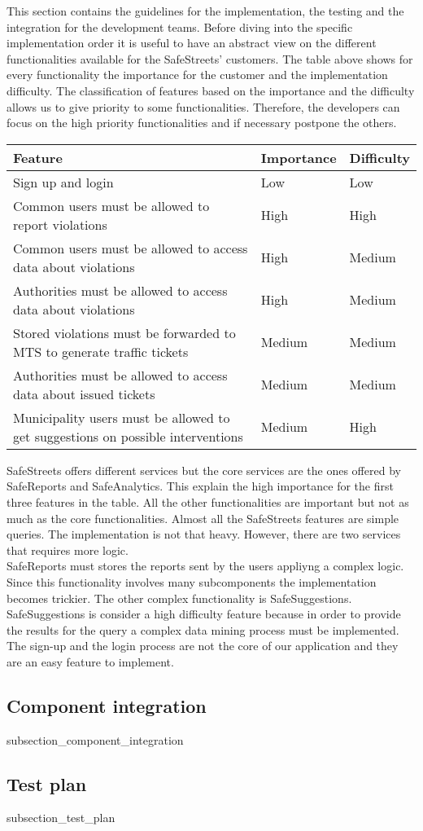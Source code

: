 \documentclass[./main.tex]{subfiles}
\begin{document}
This section contains the guidelines for the implementation, the testing and the integration for the development teams. Before diving into the specific implementation order it is useful to have an abstract view on the different functionalities available for the SafeStreets' customers. The table above shows for every functionality the importance for the customer and the implementation difficulty. The classification of features based on the importance and the difficulty allows us to give priority to some functionalities. Therefore, the developers can focus on the high priority functionalities and if necessary postpone the others.

\begin{table}[H]
\centering
\begin{tabularx}{\textwidth}{|X|l|l|}
\hline
Feature & Importance & Difficulty\tabularnewline
\hline
Sign up and login & Low & Low\tabularnewline
Common users must be allowed to report violations & High &
High\tabularnewline
Common users must be allowed to access data about violations & High &
Medium\tabularnewline
Authorities must be allowed to access data about violations & High &
Medium\tabularnewline
Stored violations must be forwarded to MTS to generate traffic tickets & Medium
& Medium\tabularnewline
Authorities must be allowed to access data about issued tickets & Medium &
Medium\tabularnewline
Municipality users must be allowed to get suggestions on possible interventions
& Medium & High\tabularnewline
\hline
\end{tabularx}
\end{table}
 
SafeStreets offers different services but the core services are the ones offered by SafeReports and SafeAnalytics. This explain the high importance for the first three features in the table. All the other functionalities are important but not as much as the core functionalities.
Almost all the SafeStreets features are simple queries. The implementation is not that heavy. However, there are two services that requires more logic.
\\SafeReports must stores the reports sent by the users appliyng a complex logic. Since this functionality involves many subcomponents the implementation becomes trickier. The other complex functionality is SafeSuggestions. SafeSuggestions is consider a high difficulty feature because in order to provide the results for the query a complex data mining process must be implemented. 
The sign-up and the login process are not the core of our application and they are an easy feature to implement. 

\subsection{Component integration}

{subsection_component_integration}

\subsection{Test plan}
{subsection_test_plan}
\end{document}
